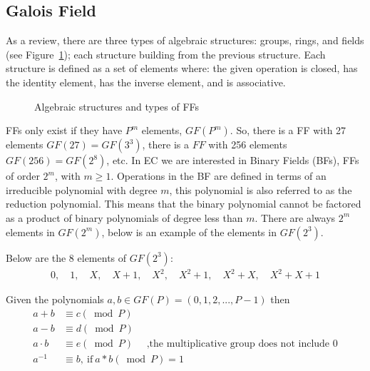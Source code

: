 \subsection{Galois Field} 
As a review, there are three types of algebraic structures: groups, rings, and fields (see Figure~\ref{fig:DH:DHKE_3}); each structure building from the previous structure.  Each structure is defined as a set of elements where: the given operation is closed, has the identity element, has the inverse element, and is associative.
\begin{figure}[H]
	  \caption{\label{fig:DH:DHKE_3} Algebraic structures and types of FFs }
\end{figure}
 FFs only exist if they have $P^m$ elements, $GF(P^m)$. So, there is a FF with 27 elements $GF(27) = GF(3^3)$, there is a $FF$ with 256 elements $GF(256) = GF(2^8)$, etc.  In EC we are interested in Binary Fields (BFs), FFs of order $2^m$, with $m ≥ 1$.  Operations in the BF are defined in terms of an irreducible polynomial with degree $m$, this polynomial is also referred to as the reduction polynomial.  This means that the binary polynomial cannot be factored as a product of binary polynomials of degree less than $m$.  There are always $2^m$ elements in $GF(2^m)$, below is an example of the elements in $GF(2^3)$.  
\newline \newline
\begin{eg} Below are the 8 elements of $GF(2^3)$:
\begin{align*}
0, \quad 1, \quad X, \quad X +1, \quad X^2, \quad X^2+1, \quad X^2 + X, \quad X^2 + X + 1
 \end{align*}
\end{eg}
\begin{rem} Given the polynomials $a,b \in  GF(P) = (0,1,2,...,P-1)$ then 
\begin{align*} 		
		a + b &\equiv c (\bmod P)\\
		a - b &\equiv d (\bmod P)\\
		a \cdot b &\equiv e (\bmod P) \quad \text{ ,the multiplicative group does not include 0}\\
		a^{-1} &\equiv b, \mathrm{~if~} a * b (\bmod P) = 1
\end{align*}
\end{rem}	
